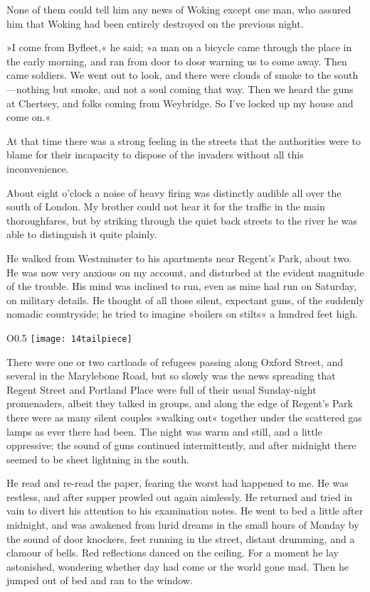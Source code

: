 None of them could tell him any news of Woking except one man, who assured him that Woking had been entirely destroyed on the previous night.

»I come from Byfleet,« he said; »a man on a bicycle came through the place in the early morning, and ran from door to door warning us to come away. Then came soldiers. We went out to look, and there were clouds of smoke to the south—nothing but smoke, and not a soul coming that way. Then we heard the guns at Chertsey, and folks coming from Weybridge. So I've locked up my house and come on.«

At that time there was a strong feeling in the streets that the authorities were to blame for their incapacity to dispose of the invaders without all this inconvenience.

About eight o'clock a noise of heavy firing was distinctly audible all over the south of London. My brother could not hear it for the traffic in the main thoroughfares, but by striking through the quiet back streets to the river he was able to distinguish it quite plainly.

He walked from Westminster to his apartments near Regent's Park, about two. He was now very anxious on my account, and disturbed at the evident magnitude of the trouble. His mind was inclined to run, even as mine had run on Saturday, on military details. He thought of all those silent, expectant guns, of the suddenly nomadic countryside; he tried to imagine »boilers on stilts« a hundred feet high.

\begin{wrapfigure}{O}{0.5\textwidth}
\centering
\texttt{[image: 14tailpiece]}
\end{wrapfigure}

There were one or two cartloads of refugees passing along Oxford Street, and several in the Marylebone Road, but so slowly was the news spreading that Regent Street and Portland Place were full of their usual Sunday-night promenaders, albeit they talked in groups, and along the edge of Regent's Park there were as many silent couples »walking out« together under the scattered gas lamps as ever there had been. The night was warm and still, and a little oppressive; the sound of guns continued intermittently, and after midnight there seemed to be sheet lightning in the south.

He read and re-read the paper, fearing the worst had happened to me. He was restless, and after supper prowled out again aimlessly. He returned and tried in vain to divert his attention to his examination notes. He went to bed a little after midnight, and was awakened from lurid dreams in the small hours of Monday by the sound of door knockers, feet running in the street, distant drumming, and a clamour of bells. Red reflections danced on the ceiling. For a moment he lay astonished, wondering whether day had come or the world gone mad. Then he jumped out of bed and ran to the window.

